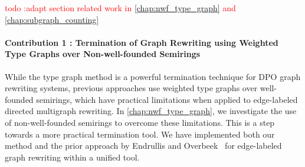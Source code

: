 \textcolor{red}{todo :adapt section related work in \autoref{chap:nwf_type_graph} and \autoref{chap:subgraph_counting}}


\paragraph{Contribution 1 : Termination of Graph Rewriting using Weighted Type Graphs over Non-well-founded Semirings} 
While the type graph method is a powerful termination technique for DPO graph rewriting systems, previous approaches use weighted type graphs over well-founded semirings, which have practical limitations when applied to edge-labeled directed multigraph rewriting. In \autoref{chap:nwf_type_graph}, we investigate the use of non-well-founded semirings to overcome these limitations. This is a step towards a more practical termination tool.
We have implemented both our method and the prior approach by Endrullis and Overbeek~\cite{overbeek2024termination_lmcs} for edge-labeled graph rewriting within a unified tool.

